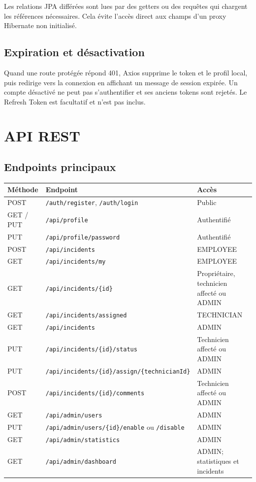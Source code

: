 \documentclass[12pt,a4paper,oneside]{report}
\begin{document}
Les relations JPA différées sont lues par des getters ou des requêtes qui chargent les références nécessaires. Cela évite l'accès direct aux champs d'un proxy Hibernate non initialisé.

\section{Expiration et désactivation}
Quand une route protégée répond 401, Axios supprime le token et le profil local, puis redirige vers la connexion en affichant un message de session expirée. Un compte désactivé ne peut pas s'authentifier et ses anciens tokens sont rejetés. Le Refresh Token est facultatif et n'est pas inclus.

\chapter{API REST}
\section{Endpoints principaux}
\small
\begin{longtable}{p{2cm}p{7.2cm}p{4.3cm}}
\toprule
\textbf{Méthode} & \textbf{Endpoint} & \textbf{Accès}\\
\midrule
POST & \texttt{/auth/register}, \texttt{/auth/login} & Public\\
GET / PUT & \texttt{/api/profile} & Authentifié\\
PUT & \texttt{/api/profile/password} & Authentifié\\
POST & \texttt{/api/incidents} & EMPLOYEE\\
GET & \texttt{/api/incidents/my} & EMPLOYEE\\
GET & \texttt{/api/incidents/\{id\}} & Propriétaire, technicien affecté ou ADMIN\\
GET & \texttt{/api/incidents/assigned} & TECHNICIAN\\
GET & \texttt{/api/incidents} & ADMIN\\
PUT & \texttt{/api/incidents/\{id\}/status} & Technicien affecté ou ADMIN\\
PUT & \texttt{/api/incidents/\{id\}/assign/\{technicianId\}} & ADMIN\\
POST & \texttt{/api/incidents/\{id\}/comments} & Technicien affecté ou ADMIN\\
GET & \texttt{/api/admin/users} & ADMIN\\
PUT & \texttt{/api/admin/users/\{id\}/enable} ou \texttt{/disable} & ADMIN\\
GET & \texttt{/api/admin/statistics} & ADMIN\\
GET & \texttt{/api/admin/dashboard} & ADMIN; statistiques et incidents\\
\bottomrule
\end{longtable}
\normalsize
\end{document}
